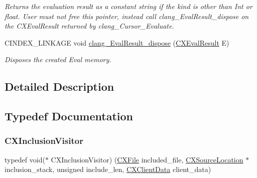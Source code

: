 \begin{DoxyCompactItemize}
\begin{DoxyCompactList}\small\item\em Returns the evaluation result as a constant string if the kind is other than Int or float. User must not free this pointer, instead call clang\+\_\+\+Eval\+Result\+\_\+dispose on the C\+X\+Eval\+Result returned by clang\+\_\+\+Cursor\+\_\+\+Evaluate. \end{DoxyCompactList}\item 
\mbox{\label{group__CINDEX__MISC_gaee104dfbff3ee6799ddebb417e968d8a}} 
C\+I\+N\+D\+E\+X\+\_\+\+L\+I\+N\+K\+A\+GE void \mbox{\hyperlink{group__CINDEX__MISC_gaee104dfbff3ee6799ddebb417e968d8a}{clang\+\_\+\+Eval\+Result\+\_\+dispose}} (\mbox{\hyperlink{group__CINDEX__MISC_gaa9270afc68877e1f3b20ce5b343191bc}{C\+X\+Eval\+Result}} E)
\begin{DoxyCompactList}\small\item\em Disposes the created Eval memory. \end{DoxyCompactList}\end{DoxyCompactItemize}


\subsection{Detailed Description}


\subsection{Typedef Documentation}
\mbox{\label{group__CINDEX__MISC_ga075c50e5cf912f15d902cff864ea7d13}} 
\subsubsection{\texorpdfstring{C\+X\+Inclusion\+Visitor}{CXInclusionVisitor}}
{\footnotesize\ttfamily typedef void($\ast$ C\+X\+Inclusion\+Visitor) (\mbox{\hyperlink{group__CINDEX__FILES_gacfcea9c1239c916597e2e5b3e109215a}{C\+X\+File}} included\+\_\+file, \mbox{\hyperlink{structCXSourceLocation}{C\+X\+Source\+Location}} $\ast$inclusion\+\_\+stack, unsigned include\+\_\+len, \mbox{\hyperlink{group__CINDEX_gacfa40c3de26d228c0d898403c2c21612}{C\+X\+Client\+Data}} client\+\_\+data)}



